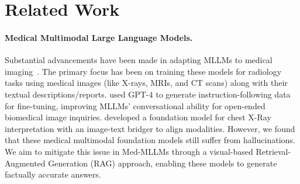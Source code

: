 \section{Related Work}
\paragraph{Medical Multimodal Large Language Models.}
Substantial advancements have been made in adapting MLLMs to medical imaging~\cite{Zhang2023PMCVQAVI, Wu2023TowardsGF, Moor2023MedFlamingoAM,Lee2023LLMCXRIL}. The primary focus has been on training these models for radiology tasks using medical images (like X-rays, MRIs, and CT scans) along with their textual descriptions/reports.
\citet{Li2023LLaVAMedTA} used GPT-4 to generate instruction-following data for fine-tuning, improving MLLMs' conversational ability for open-ended biomedical image inquiries.
\citet{Chen2024CheXagentTA} developed a foundation model for chest X-Ray interpretation with an image-text bridger to align modalities.
However, we found that these medical multimodal foundation models still suffer from hallucinations.
We aim to mitigate this issue in Med-MLLMs through a visual-based Retrieval-Augmented Generation (RAG) approach, enabling these models to generate factually accurate answers.



